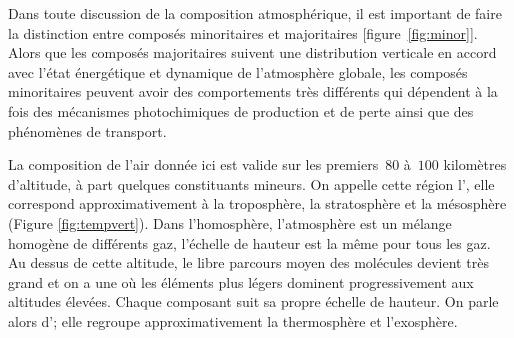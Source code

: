 \sk
\begin{finger}
\item Dans toute discussion de la composition atmosphérique, il est important de faire la distinction entre composés minoritaires et majoritaires [figure~\ref{fig:minor}]. Alors que les composés majoritaires suivent une distribution verticale en accord avec l'état énergétique et dynamique de l'atmosphère globale, les composés minoritaires peuvent avoir des comportements très différents qui dépendent à la fois des mécanismes photochimiques de production et de perte ainsi que des phénomènes de transport.
\item La composition de l'air donnée ici est valide sur les premiers~$80$ à~$100$ kilomètres d'altitude, à part quelques constituants mineurs. On appelle cette région l', elle correspond approximativement à la troposphère, la stratosphère et la mésosphère (Figure \ref{fig:tempvert}). Dans l'homosphère, l'atmosphère est un mélange homogène de différents gaz, l'échelle de hauteur est la même pour tous les gaz. Au dessus de cette altitude, le libre parcours moyen des molécules devient très grand et on a une  où les éléments plus légers dominent progressivement aux altitudes élevées. Chaque composant suit sa propre échelle de hauteur. On parle alors d'; elle regroupe approximativement la thermosphère et l'exosphère. 
\end{finger}







